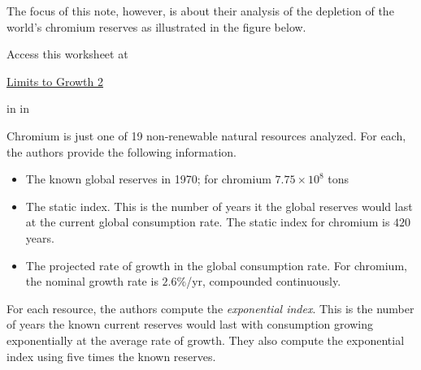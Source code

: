 \documentclass{ximera}
\newcommand{\pskip}{\vskip 0.1 in}
\begin{document}
\begin{onlineOnly}
    \begin{center}
\end{center}
\end{onlineOnly}


The focus of this note, however, is about their analysis of the depletion of the world's chromium reserves as illustrated in the figure below. %


 
\begin{onlineOnly}
    \begin{center}
\end{center}
\end{onlineOnly}

Access this worksheet at

\href{https://www.desmos.com/calculator/kv244mputa}{Limits to Growth 2}

\pskip \pskip

Chromium is just one of 19 non-renewable natural resources analyzed. For each, the authors provide the following information.

\begin{itemize}
\item{The known global reserves in 1970; for chromium $7.75\times 10^8$ tons}

\item{The static index. This is the number of years it the global reserves would last at the current global consumption rate. The static index for chromium is $420$ years.}

\item{The projected rate of growth in the global consumption rate. For chromium, the nominal growth rate is $2.6\%$/yr, compounded continuously.}

\end{itemize}

For each resource, the authors compute the \emph{exponential index}. This is the number of years the known current reserves would last with consumption growing exponentially at the average rate of growth. They also compute the exponential index using five times the known reserves. 
\end{document}
